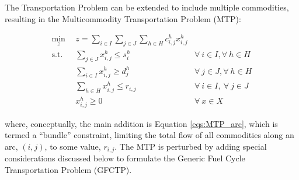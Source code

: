The Transportation Problem can be extended to include multiple commodities,
resulting in the Multicommodity Transportation Problem (MTP):

\begin{subequations}\label{eqs:MTP}
  \begin{align}
    \min_{z} \:\: & 
    z = \sum_{i \in I}\sum_{j \in J}\sum_{h \in H} c^h_{i,j} x^h_{i,j} 
    & \label{eqs:MTP_obj} \\
    \text{s.t.} \:\: &
    \sum_{j \in J} x^h_{i,j} \leq s^h_{i} 
    &
    \forall \: i \in I, \forall \: h \in H \label{eqs:MTP_sup} \\
    &
    \sum_{i \in I} x^h_{i,j} \geq d^h_{j} 
    & 
    \forall \: j \in J, \forall \: h \in H \label{eqs:MTP_dem} \\
    &
    \sum_{h \in H} x^h_{i,j} \leq r_{i,j}
    & 
    \forall \: i \in I, \:\forall \: j \in J \label{eqs:MTP_arc} \\
    &
    x^h_{i,j} \geq 0
    &
    \forall \: x \in X \label{eqs:MTP_x}
  \end{align}
\end{subequations}

where, conceptually, the main addition is Equation \ref{eqs:MTP_arc}, which is
termed a ``bundle'' constraint, limiting the total flow of all commodities along
an arc, $(i,j)$, to some value, $r_{i,j}$. The MTP is perturbed by adding
special considerations discussed below to formulate the Generic Fuel Cycle
Transportation Problem (GFCTP).

